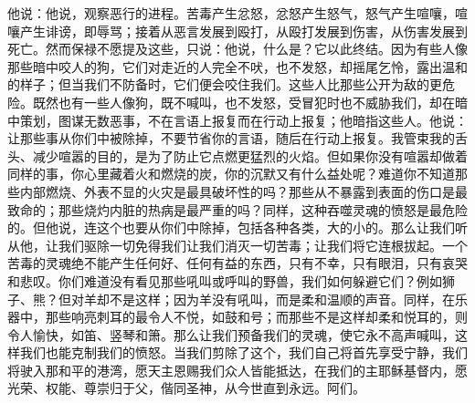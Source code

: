 他说：他说，观察恶行的进程。苦毒产生忿怒，忿怒产生怒气，怒气产生喧嚷，喧嚷产生诽谤，即辱骂；接着从恶言发展到殴打，从殴打发展到伤害，从伤害发展到死亡。然而保禄不愿提及这些，只说：他说，什么是？它以此终结。因为有些人像那些暗中咬人的狗，它们对走近的人完全不吠，也不发怒，却摇尾乞怜，露出温和的样子；但当我们不防备时，它们便会咬住我们。这些人比那些公开为敌的更危险。既然也有一些人像狗，既不喊叫，也不发怒，受冒犯时也不威胁我们，却在暗中策划，图谋无数恶事，不在言语上报复而在行动上报复；他暗指这些人。他说：让那些事从你们中被除掉，不要节省你的言语，随后在行动上报复。我管束我的舌头、减少喧嚣的目的，是为了防止它点燃更猛烈的火焰。但如果你没有喧嚣却做着同样的事，你心里藏着火和燃烧的炭，你的沉默又有什么益处呢？难道你不知道那些内部燃烧、外表不显的火灾是最具破坏性的吗？那些从不暴露到表面的伤口是最致命的；那些烧灼内脏的热病是最严重的吗？同样，这种吞噬灵魂的愤怒是最危险的。但他说，连这个也要从你们中除掉，包括各种各类，大的小的。那么让我们听从他，让我们驱除一切免得我们让我们消灭一切苦毒；让我们将它连根拔起。一个苦毒的灵魂绝不能产生任何好、任何有益的东西，只有不幸，只有眼泪，只有哀哭和悲叹。你们难道没有看见那些吼叫或呼叫的野兽，我们如何躲避它们？例如狮子、熊？但对羊却不是这样；因为羊没有吼叫，而是柔和温顺的声音。同样，在乐器中，那些响亮刺耳的最令人不悦，如鼓和号；而那些不是这样却柔和悦耳的，则令人愉快，如笛、竖琴和箫。那么让我们预备我们的灵魂，使它永不高声喊叫，这样我们也能克制我们的愤怒。当我们剪除了这个，我们自己将首先享受宁静，我们将驶入那和平的港湾，愿天主恩赐我们众人皆能抵达，在我们的主耶稣基督内，愿光荣、权能、尊崇归于父，偕同圣神，从今世直到永远。阿们。\par



\section{}

\par

\par

